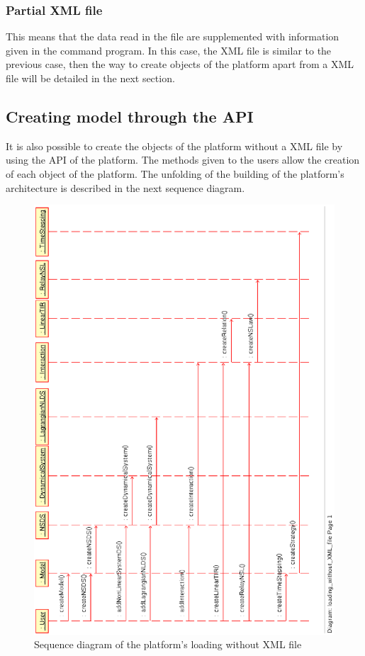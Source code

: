 \subsubsection{Partial XML file}
This means that the data read in the file are supplemented with information given in the command
program.
In this case, the XML file is similar to the previous case, then the way to create objects of
the platform apart from a XML file will be detailed in the next section.

\subsection{Creating model through the API}


It is also  possible to create the objects of the platform without a XML file by using the API of the platform. The methods given to the users allow the creation of each object of the platform. The unfolding of the building of the platform's architecture is described in the next sequence diagram.
\begin{figure}
\begin{center}
        \includegraphics[scale=0.75, clip]{figure/platform_loading.ps}
        \caption{Sequence diagram of the platform's loading without XML file}
        \label{fig: platform's loading2}
\end{center}
\end{figure}

